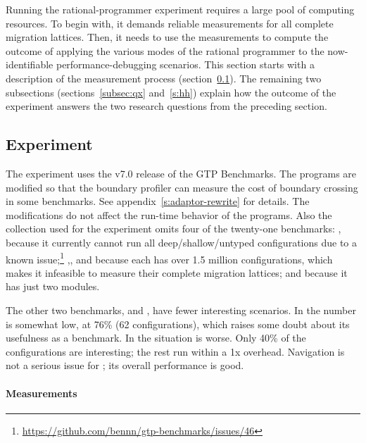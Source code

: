 \newcommand{\numgtp}{16}
\newcommand{\boundaryMB}{536} %
\newcommand{\statisticalMB}{4645} %
\newcommand{\runtimeMB}{44}

Running the rational-programmer experiment requires a large pool of computing
resources.  To begin with, it demands reliable measurements for all complete
migration lattices. Then, it needs to use the measurements to compute the
outcome of applying the various modes of the rational programmer to the
now-identifiable performance-debugging scenarios. This section starts with a
description of the measurement process (section~\ref{subsec:experiment}). The
remaining two subsections (sections~\ref{subsec:qx} and~\ref{s:hh}) explain how
the outcome of the experiment answers the two research questions from the
preceding section.

\subsection{Experiment} \label{subsec:experiment} \label{sec:data}

The experiment uses the v7.0 release of the GTP Benchmarks. The programs are
modified so that the boundary profiler can measure the cost of boundary crossing
in some benchmarks. See appendix~\ref{s:adaptor-rewrite} for details.  The
modifications do not affect the run-time behavior of the programs.  Also the
collection used for the experiment omits four of the twenty-one benchmarks:
, because it currently cannot run all deep/shallow/untyped
configurations due to a known issue;\footnote{
\url{https://github.com/bennn/gtp-benchmarks/issues/46}}
,, and  because each has over 1.5
million configurations, which makes it infeasible to measure their complete
migration lattices; and  because it has just two modules.

The other two benchmarks,  and , have
fewer interesting scenarios.
In  the number is somewhat low, at 76\% (62 configurations),
which raises some doubt about its usefulness as a benchmark.
In  the situation is worse.
Only 40\% of the configurations are interesting; the rest run within a 1x
overhead.
Navigation is not a serious issue for ; its overall
performance is good.

\paragraph{Measurements} 


